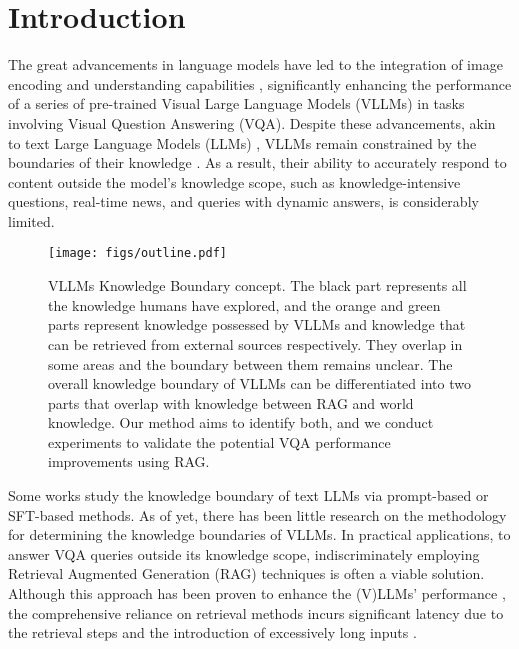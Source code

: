 \section{Introduction}

The great advancements in language models have led to the integration of image encoding and understanding capabilities \cite{achiam2023gpt,lu2024deepseekvl, Qwen2-VL}, significantly enhancing the performance of a series of pre-trained  Visual Large Language Models (VLLMs) in tasks involving Visual Question Answering (VQA). Despite these advancements, akin to text Large Language Models (LLMs) \cite{touvron2023llama, workshop2022bloom, zhang2024exploring}, VLLMs remain constrained by the boundaries of their knowledge \cite{lin-byrne-2022-retrieval}. As a result, their ability to accurately respond to content outside the model's knowledge scope, such as knowledge-intensive questions, real-time news, and queries with dynamic answers, is considerably limited. 

\begin{figure}[tb]
\centering
\texttt{[image: figs/outline.pdf]}
\caption{VLLMs Knowledge Boundary concept. The black part represents all the knowledge humans have explored, and the orange and green parts represent knowledge possessed by VLLMs and knowledge that can be retrieved from external sources respectively. They overlap in some areas and the boundary between them remains unclear. The overall knowledge boundary of VLLMs can be differentiated into two parts that overlap with knowledge between RAG and world knowledge. Our method aims to identify both, and we conduct experiments to validate the potential VQA performance improvements using RAG.}
\label{outline}
\end{figure}

Some works study the knowledge boundary of text LLMs \cite{li2025refine, cheng2024can, zhang2024exploring, ren2023investigating} via prompt-based or SFT-based methods.
As of yet, there has been little research on the methodology for determining the knowledge boundaries of VLLMs. In practical applications, to answer VQA queries outside its knowledge scope, indiscriminately employing Retrieval Augmented Generation (RAG) techniques is often a viable solution. 
Although this approach has been proven to enhance the (V)LLMs' performance \cite{wang2021improving, lewis2020retrieval, chen-etal-2017-reading}, the comprehensive reliance on retrieval methods incurs significant latency due to the retrieval steps and the introduction of excessively long inputs \cite{chevalier2023adapting, zhang2024longcontextcompressionactivation, chen-etal-2024-improving-retrieval}.

